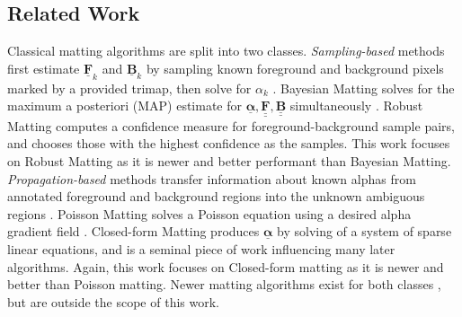 \documentclass{article}
\def\vt#1{\underline{\mathbf{#1}}}
\def\vts#1{\underline{\boldsymbol{#1}}}
\def\mt#1{\underline{\underline{\mathbf{#1}}}}
\begin{document}
\begin{multicols}{2}[]




\section{Related Work}

Classical matting algorithms are split into two classes. \emph{Sampling-based} methods first estimate $\vt F_k$ and $\vt B_k$ by sampling known foreground and background pixels marked by a provided trimap, then solve for $\alpha_k$ \cite{dim-paper}. Bayesian Matting solves for the maximum a posteriori (MAP) estimate for $\vts \alpha,\mt F,\mt B$ simultaneously \cite{bayesian-matting}. Robust Matting computes a confidence measure for foreground-background sample pairs, and chooses those with the highest confidence as the samples. This work focuses on Robust Matting as it is newer and better performant than Bayesian Matting. \emph{Propagation-based} methods transfer information about known alphas from annotated foreground and background regions into the unknown ambiguous regions \cite{dim-paper}. Poisson Matting solves a Poisson equation using a desired alpha gradient field \cite{poisson-matting}. Closed-form Matting produces $\vts \alpha$ by solving of a system of sparse linear equations, and is a seminal piece of work influencing many later algorithms. Again, this work focuses on Closed-form matting as it is newer and better than Poisson matting. Newer matting algorithms exist for both classes \cite{closed-form-survey}, but are outside the scope of this work.  %


\end{multicols}
\end{document}
